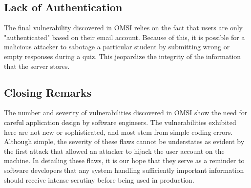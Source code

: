 


\subsection*{Lack of Authentication}
The final vulnerability discovered in OMSI relies on the fact that users are only "authenticated" based on their email account.  Because of this, it is possible for a malicious attacker to sabotage a particular student by submitting wrong or empty responses during a quiz.  This jeopardize the integrity of the information that the server stores.  

\subsection*{Closing Remarks}
The number and severity of vulnerabilities discovered in OMSI show the need for careful application design by software engineers.  The vulnerabilities exhibited here are not new or sophisticated, and most stem from simple coding errors.  Although simple, the severity of these flaws cannot be understates as evident by the first attack that allowed an attacker to hijack the user account on the machine.  In detailing these flaws, it is our hope that they serve as a reminder to software developers that any system handling sufficiently important information should receive intense scrutiny before being used in production.

